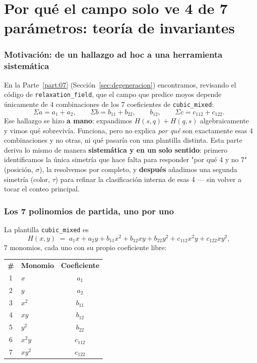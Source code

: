 \documentclass[11pt, a4paper]{article}
\newcommand{\TH}[1]{\cellcolor{cTHbg}\color{white}\textbf{#1}}
\begin{document}
\part{Por qu\'e el campo solo ve 4 de 7 par\'ametros: teor\'ia de invariantes}
\label{part:08}

\section{Motivaci\'on: de un hallazgo ad hoc a una herramienta sistem\'atica}

En la Parte~\ref{part:07} (Secci\'on~\ref{sec:degeneracion}) encontramos,
revisando el c\'odigo de \texttt{relaxation\_field}, que el campo que
predice moyos depende \'unicamente de 4 combinaciones de los 7
coeficientes de \texttt{cubic\_mixed}:
\[
\Sigma a = a_1+a_2, \qquad \Sigma b = b_{11}+b_{22}, \qquad b_{12},
\qquad \Sigma c = c_{112}+c_{122}.
\]
Ese hallazgo se hizo \textbf{a mano}: expandimos $H(s,q)+H(q,s)$
algebraicamente y vimos qu\'e sobreviv\'ia. Funciona, pero no explica
\emph{por qu\'e} son exactamente esas 4 combinaciones y no otras, ni
qu\'e pasar\'ia con una plantilla distinta. Esta parte deriva lo
mismo de manera \textbf{sistem\'atica y en un solo sentido}: primero
identificamos la \'unica simetr\'ia que hace falta para responder
"por qu\'e 4 y no 7" (posici\'on, $\sigma$), la resolvemos por
completo, y \textbf{despu\'es} a\~nadimos una segunda simetr\'ia
(color, $\tau$) para refinar la clasificaci\'on interna de esas 4 ---
sin volver a tocar el conteo principal.

\section{Los 7 polinomios de partida, uno por uno}
\label{sec:los7}

La plantilla \texttt{cubic\_mixed} es
\[
H(x,y) \;=\; a_1x + a_2y + b_{11}x^2 + b_{12}xy + b_{22}y^2
+ c_{112}x^2y + c_{122}xy^2,
\]
7 monomios, cada uno con su propio coeficiente libre:

\medskip
\begin{center}
\begin{tabular}{clc}
  \TH{\#} & \TH{Monomio} & \TH{Coeficiente} \\[1pt]
  1 & $x$     & $a_1$ \\
  2 & $y$     & $a_2$ \\
  3 & $x^2$   & $b_{11}$ \\
  4 & $xy$    & $b_{12}$ \\
  5 & $y^2$   & $b_{22}$ \\
  6 & $x^2y$  & $c_{112}$ \\
  7 & $xy^2$  & $c_{122}$ \\
\end{tabular}
\end{center}
\medskip
\end{document}
